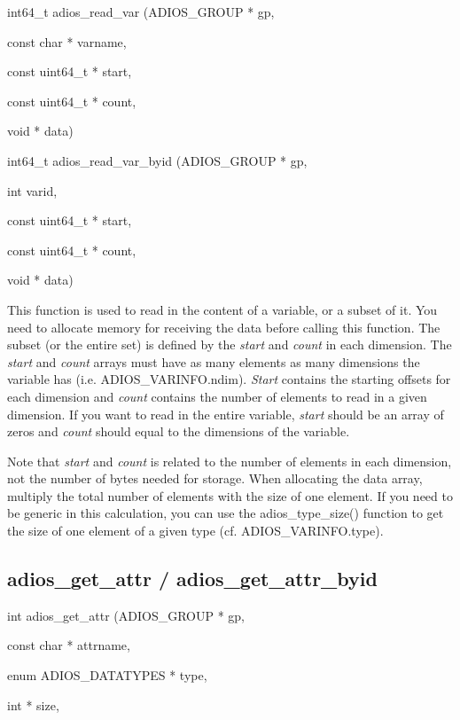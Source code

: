 int64\_t adios\_read\_var (ADIOS\_GROUP    * gp, 

\parindent=86pt
const char     * varname,

const uint64\_t * start,

\parindent=172pt
const uint64\_t * count,

\parindent=86pt
void           * data)

\parindent=0pt
int64\_t adios\_read\_var\_byid (ADIOS\_GROUP * gp, 

\parindent=104pt
int varid,

const uint64\_t * start, 

\parindent=208pt
const uint64\_t * count,

\parindent=104pt
void * data)

\parindent=0pt
This function is used to read in the content of a variable, or a subset of it. 
You need to allocate memory for receiving the data before calling this function. 
The subset (or the entire set) is defined by the \textit{start} and \textit{count} 
in each dimension. The \textit{start} and \textit{count} arrays must have as many 
elements as many dimensions the variable has (i.e. ADIOS\_VARINFO.ndim). \textit{Start 
}contains the starting offsets for each dimension and \textit{count }contains the 
number of elements to read in a given dimension. If you want to read in the entire 
variable, \textit{start} should be an array of zeros and \textit{count} should 
equal to the dimensions of the variable. 

Note that \textit{start} and \textit{count} is related to the number of elements 
in each dimension, not the number of bytes needed for storage. When allocating 
the data array, multiply the total number of elements with the size of one element. 
If you need to be generic in this calculation, you can use the adios\_type\_size() 
function to get the size of one element of a given type (cf. ADIOS\_VARINFO.type). 
\label{HToc182553408}

\subsection{adios\_get\_attr / adios\_get\_attr\_byid}

int adios\_get\_attr (ADIOS\_GROUP           * gp,

\parindent=72pt
const char            * attrname,

enum ADIOS\_DATATYPES  * type,

\parindent=144pt
int                   * size,

